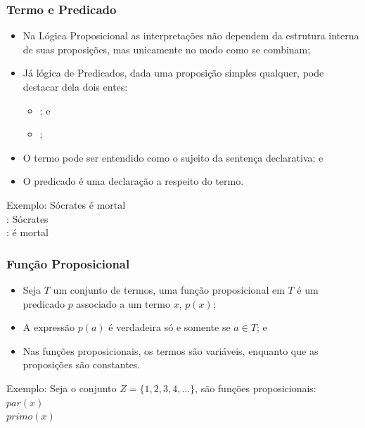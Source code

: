 \documentclass[aspectratio=169]{beamer} %
\begin{document}
\begin{frame}
\frametitle{Termo e Predicado}

\begin{itemize}
	\item Na Lógica Proposicional as interpretações não dependem da estrutura interna de suas proposições, mas unicamente no modo como se combinam;
	\item Já lógica de Predicados, dada uma proposição simples qualquer, pode destacar dela dois entes:
	\begin{itemize}
		\item {}; e
		\item {};
	\end{itemize}
	\item O termo pode ser entendido como o sujeito da sentença declarativa; e
	\item O predicado é uma declaração a respeito do termo.
\end{itemize}\vfill

\begin{exampleblock}{Exemplo:}
Sócrates é mortal\\
: Sócrates\\
: é mortal
\end{exampleblock}
\end{frame}

\begin{frame}
\frametitle{Função Proposicional}

\begin{itemize}
	\item Seja $T$ um conjunto de termos, uma função proposicional em $T$ é um predicado $p$ associado a um termo $x$, $p(x)$;
	\item A expressão $p(a)$ é verdadeira só e somente se $a \in T$; e
	\item Nas funções proposicionais, os termos são variáveis, enquanto que as proposições são constantes.
\end{itemize}\vfill

\begin{exampleblock}{Exemplo:}
Seja o conjunto $Z = \{1, 2, 3, 4, . . .\}$, são funções proposicionais:\\
$par(x)$\\
$primo(x)$
\end{exampleblock}
\end{frame}
\end{document}
